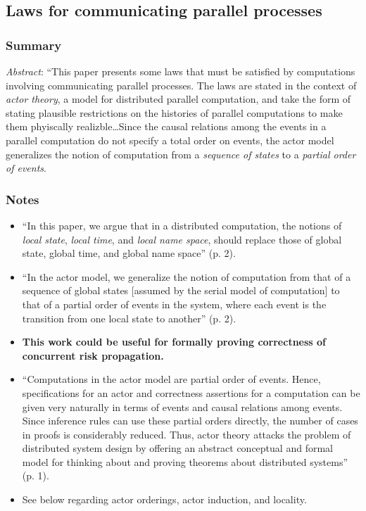 \subsection{Laws for communicating parallel processes}


\subsubsection*{Summary}

\emph{Abstract}: ``This paper presents some laws that must be satisfied by computations involving communicating parallel processes. The laws are stated in the context of \emph{actor theory}, a model for distributed parallel computation, and take the form of stating plausible restrictions on the histories of parallel computations to make them phyiscally realizble{\ldots}Since the causal relations among the events in a parallel computation do not specify a total order on events, the actor model generalizes the notion of computation from a \emph{sequence of states} to a \emph{partial order of events}.

\subsubsection*{Notes}

\begin{itemize}
  \item ``In this paper, we argue that in a distributed computation, the notions of \emph{local state}, \emph{local time}, and \emph{local name space}, should replace those of global state, global time, and global name space'' (p. 2).
  \item ``In the actor model, we generalize the notion of computation from that of a sequence of global states [assumed by the serial model of computation] to that of a partial order of events in the system, where each event is the transition from one local state to another'' (p. 2).
  \item \textbf{This work could be useful for formally proving correctness of concurrent risk propagation.}
  \item ``Computations in the actor model are partial order of events. Hence, specifications for an actor and correctness assertions for a computation can be given very naturally in terms of events and causal relations among events. Since inference rules can use these partial orders directly, the number of cases in proofs is considerably reduced. Thus, actor theory attacks the problem of distributed system design by offering an abstract conceptual and formal model for thinking about and proving theorems about distributed systems'' (p. 1).
  \item See below regarding actor orderings, actor induction, and locality.
\end{itemize}

